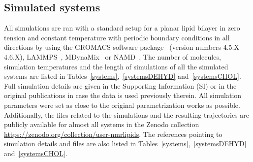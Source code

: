 \documentclass[journal=jpcbfk,manuscript=article]{achemso}
\begin{document}
\subsection{Simulated systems}
All simulations are ran with a standard setup for a planar lipid bilayer in zero tension and constant temperature
with periodic boundary conditions in all directions by using the GROMACS software package~\cite{hess08} 
(version numbers 4.5.X--4.6.X), LAMMPS~\cite{plimpton95}, MDynaMix~\cite{Lyubartsev00} or NAMD~\cite{phillips05}.
The number of molecules, simulation temperatures and the length of simulations of all the simulated systems 
are listed in Tables~\ref{systems},~\ref{systemsDEHYD} and~\ref{systemsCHOL}. Full simulation
details are given in the Supporting Information (SI) or in the original publications in case the
data is used previously therein. All simulation parameters were set as close to the original 
parametrization works as possible.
Additionally, the files related to the simulations and the resulting trajectories are publicly
available for almost all systems in the Zenodo collection \url{https://zenodo.org/collection/user-nmrlipids}. 
The references pointing to simulation details and files are also listed in Tables~\ref{systems},~\ref{systemsDEHYD} and~\ref{systemsCHOL}.
\end{document}
